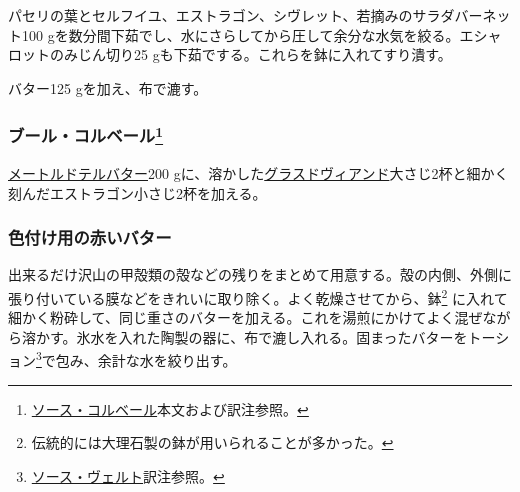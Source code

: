 \begin{recette}
パセリの葉とセルフイユ、エストラゴン、シヴレット、若摘みのサラダバーネット100
gを数分間下茹でし、水にさらしてから圧して余分な水気を絞る。エシャロットのみじん切り25
gも下茹でする。これらを鉢に入れてすり潰す。

バター125 gを加え、布で漉す。

\hypertarget{beurre-colbert}{%
\subsubsection[ブール・コルベール]{\texorpdfstring{ブール・コルベール\footnote{\protect\hyperlink{sauce-colbert}{ソース・コルベール}本文および訳注参照。}}{ブール・コルベール}}\label{beurre-colbert}}



\protect\hyperlink{beurre-maitre-d-hotel}{メートルドテルバター}200
gに、溶かした\protect\hyperlink{glace-de-viande}{グラスドヴィアンド}大さじ2杯と細かく刻んだエストラゴン小さじ2杯を加える。

\hypertarget{beurre-colorant-rouge}{%
\subsubsection{色付け用の赤いバター}\label{beurre-colorant-rouge}}



出来るだけ沢山の甲殻類の殻などの残りをまとめて用意する。殻の内側、外側に張り付いている膜などをきれいに取り除く。よく乾燥させてから、鉢\footnote{伝統的には大理石製の鉢が用いられることが多かった。}
に入れて細かく粉砕して、同じ重さのバターを加える。これを湯煎にかけてよく混ぜながら溶かす。氷水を入れた陶製の器に、布で漉し入れる。固まったバターをトーション\footnote{\protect\hyperlink{sauce-verte}{ソース・ヴェルト}訳注参照。}で包み、余計な水を絞り出す。


\end{recette}
